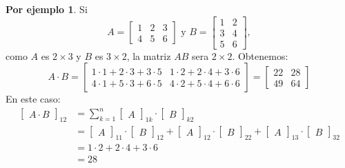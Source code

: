 \documentclass{article}
\theoremstyle{definition}
\theoremstyle{definition}
\newtheorem*{ej}{Por ejemplo}
\theoremstyle{remark}
\begin{document}
  \begin{ej}
  Si \[
    A=\begin{bmatrix} 1 & 2 & 3 \\ 4 & 5 & 6 \end{bmatrix} \text{ y } B=\begin{bmatrix} 1 & 2 \\ 3 & 4 \\ 5 & 6 \end{bmatrix},
  \]
  como $A$ es $2 \times 3$ y $B$ es $3 \times 2$, la matriz $AB$ sera $2 \times 2$. Obtenemos: \[
    A\cdot B = \begin{bmatrix} 
      1 \cdot 1 + 2 \cdot 3 + 3 \cdot 5 & 1 \cdot 2 + 2 \cdot 4 + 3 \cdot 6 \\
      4 \cdot 1 + 5 \cdot 3 + 6 \cdot 5 & 4 \cdot 2 + 5 \cdot 4 + 6 \cdot 6 
      \end{bmatrix} = \begin{bmatrix} 22 & 28 \\ 49 & 64 \end{bmatrix}
  \]
  En este caso: \[
    \begin{aligned}
      \begin{bmatrix}A\cdot B \end{bmatrix}_{12} & = \sum_{k=1}^{n}{\begin{bmatrix}A\end{bmatrix}_{1k}\cdot \begin{bmatrix}B\end{bmatrix}_{k2}} \\
                                                 & = \begin{bmatrix}A\end{bmatrix}_{11} \cdot \begin{bmatrix}B\end{bmatrix}_{12} + \begin{bmatrix} A \end{bmatrix}_{12} \cdot \begin{bmatrix} B \end{bmatrix}_{22} + \begin{bmatrix}A\end{bmatrix}_{13} \cdot \begin{bmatrix} B \end{bmatrix}_{32} \\
                                                 & = 1 \cdot 2 + 2 \cdot 4 + 3 \cdot 6 \\
                                                 & = 28
    \end{aligned}
  \]
\end{ej}
\end{document}
